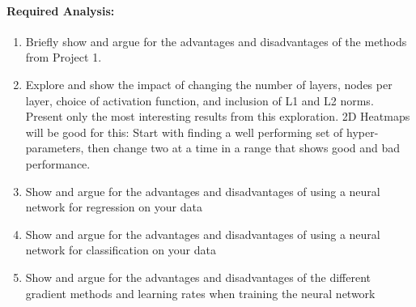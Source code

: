 \documentclass[%
oneside,                 %
final,                   %
10pt]{article}
\begin{document}
\noindent
\paragraph{Required Analysis:}
\begin{enumerate}
\item Briefly show and argue for the advantages and disadvantages of the methods from Project 1.

\item Explore and show the impact of changing the number of layers, nodes per layer, choice of activation function, and inclusion of L1 and L2 norms. Present only the most interesting results from this exploration. 2D Heatmaps will be good for this: Start with finding a well performing set of hyper-parameters, then change two at a time in a range that shows good and bad performance.

\item Show and argue for the advantages and disadvantages of using a neural network for regression on your data

\item Show and argue for the advantages and disadvantages of using a neural network for classification on your data

\item Show and argue for the advantages and disadvantages of the different gradient methods and learning rates when training the neural network
\end{enumerate}

\noindent
\end{document}
